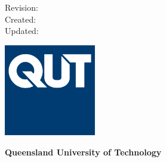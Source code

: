 \makeatletter %
\begin{titlepage}
    \begin{flushright}

        \ifdefined\technotedetails
            \large{\textbf{\technotedetails}}
        \fi
        \vspace*{4cm}

        \huge{\textbf{\@title}}
        \vspace*{2cm} 

        \small{\@author}
        \vspace*{2cm} 

        \small{Revision: \revision} \\
        \small{Created: \@date} \\
        \ifdefined\daterevised
            \small{Updated: \daterevised}
        \fi
        \vfill

        \includegraphics[width=0.3\textwidth]{qut-logo.jpg}

        \vspace*{0.5cm}
        \textbf{Queensland University of Technology} \\
        \small{\department}

    \end{flushright}
\end{titlepage}